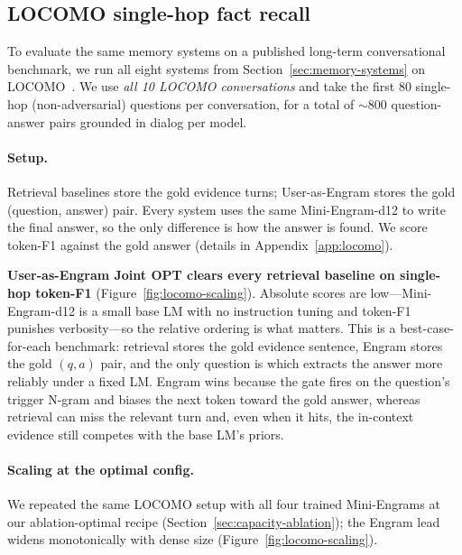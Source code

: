 \documentclass[letterpaper]{article} %
\begin{document}
\subsection{LOCOMO single-hop fact recall}
\label{sec:locomo}

To evaluate the same memory systems on a published long-term
conversational benchmark, we run all eight systems from
Section~\ref{sec:memory-systems} on
LOCOMO~\citep{maharana2024locomo}. We use \emph{all 10 LOCOMO
conversations} and take the first 80 single-hop (non-adversarial)
questions per conversation, for a total of $\sim$800
question-answer pairs grounded in dialog per model.

\paragraph{Setup.} Retrieval baselines store the gold evidence turns;
User-as-Engram stores the gold (question, answer) pair. Every system
uses the same Mini-Engram-d12 to write the final answer, so the only
difference is how the answer is found. We score token-F1 against the
gold answer (details in Appendix~\ref{app:locomo}).


\textbf{User-as-Engram Joint OPT clears every retrieval baseline
on single-hop token-F1} (Figure~\ref{fig:locomo-scaling}).
Absolute scores are low---Mini-Engram-d12 is a small base LM with
no instruction tuning and token-F1 punishes verbosity---so the
relative ordering is what matters. This is a best-case-for-each
benchmark: retrieval stores the gold evidence sentence, Engram
stores the gold $(q, a)$ pair, and the only question is which
extracts the answer more reliably under a fixed LM. Engram wins
because the gate fires on the question's trigger N-gram and
biases the next token toward the gold answer, whereas retrieval
can miss the relevant turn and, even when it hits, the
in-context evidence still competes with the base LM's priors.

\paragraph{Scaling at the optimal config.} We repeated the same
LOCOMO setup with all four trained Mini-Engrams at our
ablation-optimal recipe (Section~\ref{sec:capacity-ablation});
the Engram lead widens monotonically with dense size
(Figure~\ref{fig:locomo-scaling}).
\end{document}
